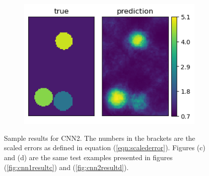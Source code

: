 \documentclass[10pt]{article}
\newcommand{\nhghalfwidth}{0.48\linewidth}
\newcommand{\nhgtotalheight}{4cm}
\begin{document}
\begin{figure}[!h]
\begin{subfigure}[c]{\nhghalfwidth}
  \end{subfigure}
  \begin{subfigure}[c]{\nhghalfwidth}
    \centering
    \includegraphics[totalheight=\nhgtotalheight]{Figures/Results2/ex4/mu.png}
  \end{subfigure}
\caption{\label{fig:cnn2result} Sample results for CNN2. The numbers in the brackets are the scaled errors as defined in equation (\ref{eqn:scalederror}). Figures (c) and (d) are the same test examples presented in figures (\ref{fig:cnn1resultc}) and (\ref{fig:cnn2resultd}).}  
\end{figure}
%
\end{document}
